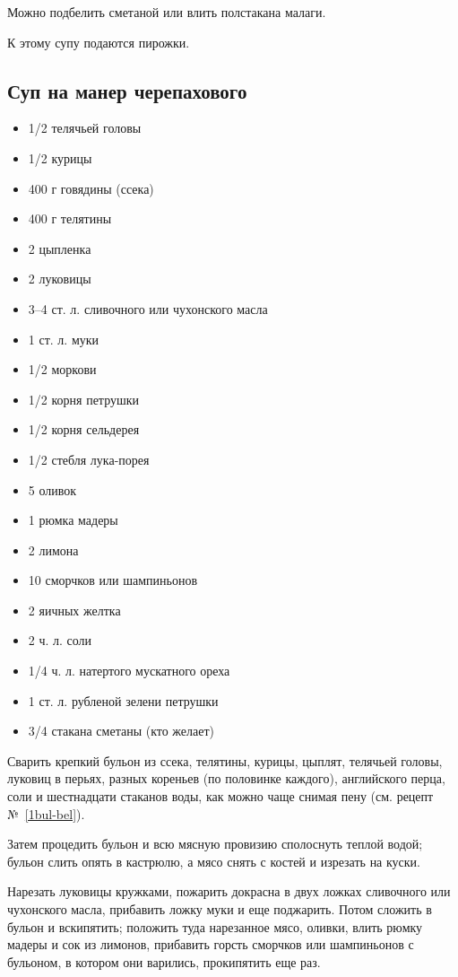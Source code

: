 Можно подбелить сметаной или влить полстакана малаги.

К этому супу подаются пирожки.

\subsection{Суп на манер черепахового}\label{39cherepah}

\begin{itemize}
	\item 1/2 телячьей головы
    \item 1/2 курицы 
    \item 400 г говядины (ссека)
    \item 400 г телятины 
    \item 2 цыпленка 
    \item 2 луковицы 
    \item 3–4 ст. л. сливочного или чухонского масла
    \item 1 ст. л. муки
    \item 1/2 моркови 
    \item 1/2 корня петрушки
    \item 1/2 корня сельдерея
    \item 1/2 стебля лука-порея
    \item 5 оливок 
    \item 1 рюмка мадеры
    \item 2 лимона 
    \item 10 сморчков или шампиньонов 
    \item 2 яичных желтка 
    \item 2 ч. л. соли 
    \item 1/4 ч. л. натертого мускатного ореха
    \item 1 ст. л. рубленой зелени петрушки 
    \item 3/4 стакана сметаны (кто желает)
\end{itemize}

Сварить крепкий бульон из ссека, телятины, курицы, цыплят, телячьей головы, луковиц в перьях, разных кореньев (по половинке каждого), английского перца, соли и шестнадцати стаканов воды, как можно чаще снимая пену (см. рецепт №~\ref{1bul-bel}).

Затем процедить бульон и всю мясную провизию сполоснуть теплой водой; бульон слить опять в кастрюлю, а мясо снять с костей и изрезать на куски.

Нарезать луковицы кружками, пожарить докрасна в двух ложках сливочного или чухонского масла, прибавить ложку муки и еще поджарить. Потом сложить в бульон и вскипятить; положить туда нарезанное мясо, оливки, влить рюмку мадеры и сок из лимонов, прибавить горсть сморчков или шампиньонов с бульоном, в котором они варились, прокипятить еще раз.

